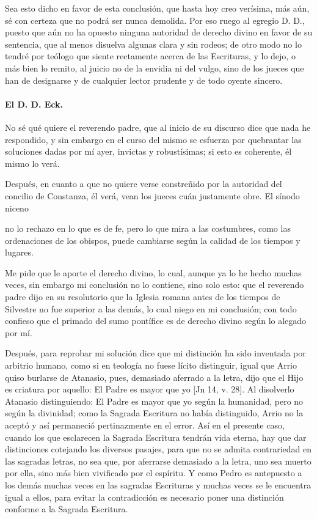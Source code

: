 Sea esto dicho en favor de esta conclusión, que hasta hoy creo verísima, más aún, sé con certeza que no podrá ser nunca demolida. Por eso ruego al egregio D. D., puesto que aún no ha opuesto ninguna autoridad de derecho divino en favor de su sentencia, que al menos disuelva algunas clara y sin rodeos; de otro modo no lo tendré por teólogo que siente rectamente acerca de las Escrituras, y lo dejo, o más bien lo remito, al juicio no de la envidia ni del vulgo, sino de los jueces que han de designarse y de cualquier lector prudente y de todo oyente sincero.

\paragraph*{El D. D. Eck.}

No sé qué quiere el reverendo padre, que al inicio de su discurso dice que nada he respondido, y sin embargo en el curso del mismo se esfuerza por quebrantar las soluciones dadas por mí ayer, invictas y robustísimas; si esto es coherente, él mismo lo verá.

Después, en cuanto a que no quiere verse constreñido por la autoridad del concilio de Constanza, él verá, vean los jueces cuán justamente obre. El sínodo niceno

no lo rechazo en lo que es de fe, pero lo que mira a las costumbres, como las ordenaciones de los obispos, puede cambiarse según la calidad de los tiempos y lugares.

Me pide que le aporte el derecho divino, lo cual, aunque ya lo he hecho muchas veces, sin embargo mi conclusión no lo contiene, sino solo esto: que el reverendo padre dijo en su resolutorio que la Iglesia romana antes de los tiempos de Silvestre no fue superior a las demás, lo cual niego en mi conclusión; con todo confieso que el primado del sumo pontífice es de derecho divino según lo alegado por mí.

Después, para reprobar mi solución dice que mi distinción ha sido inventada por arbitrio humano, como si en teología no fuese lícito distinguir, igual que Arrio quiso burlarse de Atanasio, pues, demasiado aferrado a la letra, dijo que el Hijo es criatura por aquello: El Padre es mayor que yo [Jn 14, v. 28]. Al disolverlo Atanasio distinguiendo: El Padre es mayor que yo según la humanidad, pero no según la divinidad; como la Sagrada Escritura no había distinguido, Arrio no la aceptó y así permaneció pertinazmente en el error. Así en el presente caso, cuando los que esclarecen la Sagrada Escritura tendrán vida eterna, hay que dar distinciones cotejando los diversos pasajes, para que no se admita contrariedad en las sagradas letras, no sea que, por aferrarse demasiado a la letra, uno sea muerto por ella, sino más bien vivificado por el espíritu. Y como Pedro es antepuesto a los demás muchas veces en las sagradas Escrituras y muchas veces se le encuentra igual a ellos, para evitar la contradicción es necesario poner una distinción conforme a la Sagrada Escritura.

